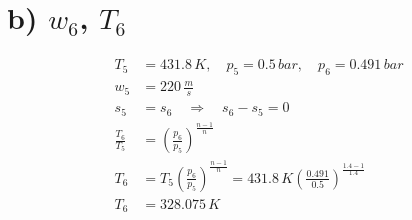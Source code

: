 \section*{b) $w_6$, $T_6$}

\begin{align*}
T_5 &= 431.8\,K, \quad p_5 = 0.5\,bar, \quad p_6 = 0.491\,bar \\
w_5 &= 220\,\frac{m}{s} \\
s_5 &= s_6 \quad \Rightarrow \quad s_6 - s_5 = 0 \\
\frac{T_6}{T_5} &= \left(\frac{p_6}{p_5}\right)^{\frac{n-1}{n}} \\
T_6 &= T_5 \left(\frac{p_6}{p_5}\right)^{\frac{n-1}{n}} = 431.8\,K \left(\frac{0.491}{0.5}\right)^{\frac{1.4-1}{1.4}} \\
T_6 &= 328.075\,K
\end{align*}